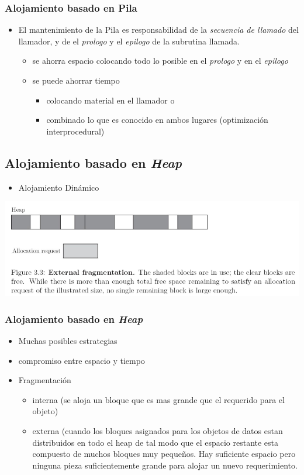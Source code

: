 \documentclass[11pt]{article}
\begin{document}
\subsubsection*{Alojamiento basado en Pila}
\label{sec:orgheadline8}
\begin{itemize}
\item El mantenimiento de la Pila es responsabilidad de la \emph{secuencia de
llamado} del llamador, y de el \emph{prologo} y el \emph{epilogo} de la
subrutina llamada.
\begin{itemize}
\item se ahorra espacio colocando todo lo posible en el \emph{prologo} y en
el \emph{epilogo}
\item se puede ahorrar tiempo
\begin{itemize}
\item colocando material en el llamador  o
\item combinado lo que es conocido en ambos lugares (optimización interprocedural)
\end{itemize}
\end{itemize}
\end{itemize}

\subsection*{Alojamiento basado en \emph{Heap}}
\label{sec:orgheadline19}
\begin{itemize}
\item Alojamiento Dinámico
\end{itemize}

\includegraphics[width=.9\linewidth]{alojdinheap.png}

\subsubsection*{Alojamiento basado en \emph{Heap}}
\label{sec:orgheadline10}
\begin{itemize}
\item Muchas posibles estrategias
\item compromiso entre espacio y tiempo
\item Fragmentación
\begin{itemize}
\item interna (se aloja un bloque que es mas grande que el requerido
para el objeto)
\item externa (cuando los bloques asignados para los objetos de datos
estan distribuidos en todo el heap de tal modo que el espacio
restante esta compuesto de muchos bloques muy pequeños. Hay
suficiente espacio pero ninguna pieza suficientemente grande para
alojar un nuevo requerimiento.
\end{itemize}
\end{itemize}
\end{document}
